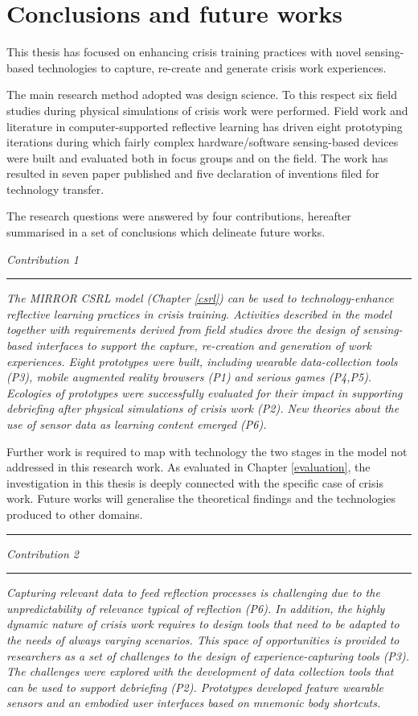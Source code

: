 \chapter{Conclusions and future works}\label{conclusions}


This thesis has focused on enhancing crisis training practices with novel sensing-based technologies to capture, re-create and generate crisis work experiences.

The main research method adopted was design science. To this respect six field studies during physical simulations of crisis work were performed. Field work and literature in computer-supported reflective learning has driven eight prototyping iterations during which fairly complex hardware/software sensing-based devices were built and evaluated both in focus groups and on the field. The work has resulted in seven paper published and five declaration of inventions filed for technology transfer.

The research questions were answered by four contributions, hereafter summarised in a set of conclusions which delineate future works. \bigskip

\emph{Contribution 1} 
\newline \rule{
\textwidth}{.1pt} \emph{The MIRROR CSRL model (Chapter \ref{csrl}) can be used to technology-enhance reflective learning practices in crisis training. Activities described in the model together with requirements derived from field studies drove the design of sensing-based interfaces to support the capture, re-creation and generation of work experiences. Eight prototypes were built, including wearable data-collection tools (P3), mobile augmented reality browsers (P1) and serious games (P4,P5). Ecologies of prototypes were successfully evaluated for their impact in supporting debriefing after physical simulations of crisis work (P2). New theories about the use of sensor data as learning content emerged (P6).}

Further work is required to map with technology the two stages in the model not addressed in this research work. As evaluated in Chapter \ref{evaluation}, the investigation in this thesis is deeply connected with the specific case of crisis work. Future works will generalise the theoretical findings and the technologies produced to other domains. \rule{
\textwidth}{.1pt} \medskip

\emph{Contribution 2} 
\newline \rule{
\textwidth}{.1pt} \emph{Capturing relevant data to feed reflection processes is challenging due to the unpredictability of relevance typical of reflection (P6). In addition, the highly dynamic nature of crisis work requires to design tools that need to be adapted to the  needs of always varying scenarios. This space of opportunities is provided to researchers as a set of challenges to the design of experience-capturing tools (P3). The challenges were explored with the development of data collection tools that can be used to support debriefing (P2). Prototypes developed feature wearable sensors and an embodied user interfaces based on mnemonic body shortcuts.}

